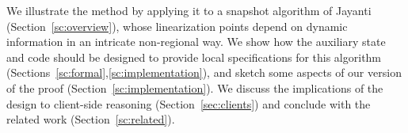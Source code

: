 We illustrate the method by applying it to a snapshot algorithm of
Jayanti~\cite{Jayanti:STOC05} (Section~\ref{sc:overview}), whose
linearization points depend on dynamic information in an intricate
non-regional way. We show how the auxiliary state and code should be
designed to provide local specifications for this algorithm
(Sections~\ref{sc:formal},\ref{sc:implementation}), and sketch some
aspects of our version of the proof (Section~\ref{sc:implementation}).
%
%
%
%
%
We discuss the implications of the design to client-side reasoning
(Section~\ref{sec:clients}) and conclude with the related work (Section~\ref{sc:related}).
%
%
%

